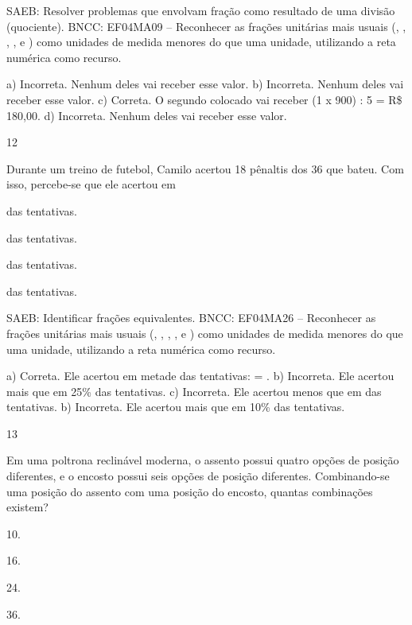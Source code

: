 \begin{mdframed}[linewidth=2pt,linecolor=salmao,roundcorner=2pt]
\begin{escolha}
{\begin{escolha}
SAEB: Resolver problemas que envolvam fração como resultado
de uma divisão (quociente).
BNCC: EF04MA09 -- Reconhecer as frações unitárias mais usuais (, , , ,  e ) como
unidades de medida menores do que uma unidade, utilizando a reta numérica como recurso.

a) Incorreta. Nenhum deles vai receber esse valor.
b) Incorreta. Nenhum deles vai receber esse valor.
c) Correta. O segundo colocado vai receber (1 x 900) : 5 = R\$ 180,00.
d) Incorreta. Nenhum deles vai receber esse valor.

\num{12}

Durante um treino de futebol, Camilo acertou 18 pênaltis dos 36 que
bateu. Com isso, percebe-se que ele acertou em

\begin{escolha}
\item
   das tentativas.
\item
   das tentativas.
\item
   das tentativas.
\item
   das tentativas.
\end{escolha}

SAEB: Identificar frações equivalentes.
BNCC: EF04MA26 -- Reconhecer as frações unitárias mais usuais (, , , ,  e ) como
unidades de medida menores do que uma unidade, utilizando a reta numérica como recurso.

a) Correta. Ele acertou em metade das tentativas:  = .
b) Incorreta. Ele acertou mais que em 25\% das tentativas.
c) Incorreta. Ele acertou menos que em  das tentativas.
b) Incorreta. Ele acertou mais que em 10\% das tentativas.

\num{13}

Em uma poltrona reclinável moderna, o assento possui quatro opções de posição
diferentes, e o encosto possui seis opções de posição diferentes. Combinando-se uma posição do assento com uma posição do encosto, quantas combinações existem?

\begin{escolha}
\item
  10.
\item
  16.
\item
  24.
\item
  36.
\end{escolha}


\end{escolha}}
\end{escolha}
\end{mdframed}

